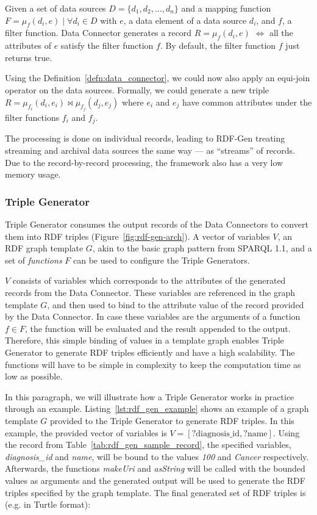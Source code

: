 \begin{defn}
  \label{defn:data_connector}
  Given a set of data sources $D = \{d_1, d_2, \dots, d_n\}$ and  a 
  mapping function $F = \mu_{f}(d_i, e)\; |\; \forall d_i \in D$ with $e$, a data element 
  of a data source $d_i$, and $f$, a filter function. Data Connector 
  generates a record $R = \mu_{f}(d_i, e)$ $\iff$ all the attributes of 
  $e$ satisfy the filter function $f$. By default, the filter function $f$ just returns true. 
\end{defn}

Using the Definition~\ref{defn:data_connector}, we could now also apply an equi-join operator 
on the data sources. Formally, we could generate a new triple 
$R =  \mu_{f_i}(d_i, e_i) \bowtie  \mu_{f_j}(d_j, e_j) $ where $e_i$ and $e_j$ have 
common attributes under the filter functions $f_i$ and $f_j$. 

The processing is done on individual records, leading to 
RDF-Gen treating streaming and archival data sources the same way --- as “streams” 
of records. Due to the record-by-record processing, the framework also has a very low 
memory usage. 

\subsubsection{Triple Generator}
Triple Generator consumes the output records 
of the Data Connectors to convert them into RDF triples (Figure~\ref{fig:rdf-gen-arch}). A vector of variables $V$, an RDF 
graph template $G$, akin to the basic graph pattern from SPARQL 1.1, and a 
set of \emph{functions} $F$ can be used to configure the Triple Generators. 

$V$ consists of variables which corresponds to the attributes of the
generated records from the Data Connector. These variables are referenced 
in the graph template $G$, and then used to 
bind to the attribute value of the record provided by the Data Connector. 
In case these variables are the arguments of a function $f \in F$, the function will 
be evaluated and the result appended to the output. Therefore, 
this simple binding of values in a template graph enables Triple Generator to 
generate RDF triples efficiently and have a high scalability.
The functions will have to be simple in complexity to keep the computation 
time as low as possible.


In this paragraph, we will illustrate how a Triple Generator works
in practice through an example.  
Listing~\ref{lst:rdf_gen_example} shows an example of a graph template $G$ provided to 
the Triple Generator to generate RDF triples. In this example, the provided vector 
of variables is $V = [\textrm{?diagnosis\_id}, \textrm{?name} ]$. Using the record 
from Table~\ref{tab:rdf_gen_sample_record}, the specified variables,
\emph{diagnosis\_id} and \emph{name}, will be bound to the values \emph{100} and 
\emph{Cancer} respectively. Afterwards, the functions \emph{makeUri} and \emph{asString} will 
be called with the bounded values as arguments and the generated 
output will be used to generate the RDF triples specified by 
the graph template. 
The final generated set of RDF triples is (e.g. in Turtle format): 

